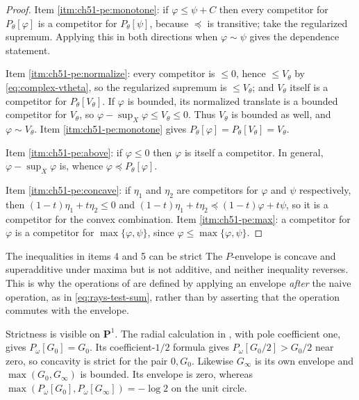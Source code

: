 \begin{proof}
Item \cref{itm:ch51-pe:monotone}: if $\varphi\leq\psi+C$ then every
competitor for $P_\theta[\varphi]$ is a competitor for
$P_\theta[\psi]$, because $\preceq$ is transitive; take the
regularized supremum.  Applying this in both directions when
$\varphi\sim\psi$ gives the dependence statement.

Item \cref{itm:ch51-pe:normalize}: every competitor is $\leq0$, hence
$\leq V_\theta$ by \eqref{eq:complex-vtheta}, so the regularized
supremum is $\leq V_\theta$; and $V_\theta$ itself is a competitor for
$P_\theta[V_\theta]$.  If $\varphi$ is bounded, its normalized
translate is a bounded competitor for $V_\theta$, so
$\varphi-\sup_X\varphi\leq V_\theta\leq0$.  Thus $V_\theta$ is bounded
as well, and $\varphi\sim V_\theta$.  Item \cref{itm:ch51-pe:monotone} gives
$P_\theta[\varphi]=P_\theta[V_\theta]=V_\theta$.

Item \cref{itm:ch51-pe:above}: if $\varphi\leq0$ then $\varphi$ is
itself a competitor.  In general, $\varphi-\sup_X\varphi$ is, whence
$\varphi\preceq P_\theta[\varphi]$.

Item \cref{itm:ch51-pe:concave}: if $\eta_1$ and $\eta_2$ are
competitors for $\varphi$ and $\psi$ respectively, then
$(1-t)\eta_1+t\eta_2\leq0$ and
$(1-t)\eta_1+t\eta_2\preceq(1-t)\varphi+t\psi$, so it is a competitor
for the convex combination.  Item \cref{itm:ch51-pe:max}: a competitor for
$\varphi$ is a competitor for $\max\{\varphi,\psi\}$, since
$\varphi\leq\max\{\varphi,\psi\}$.
\end{proof}

\begin{warning}{The inequalities in items 4 and 5 can be strict}
\label{warn:ch51-p-not-linear}
The $P$-envelope is concave and superadditive under maxima but is not
additive, and neither inequality reverses.  This is why the operations
of  are defined by applying an envelope
\emph{after} the naive operation, as in
\eqref{eq:rays-test-sum}, rather than by asserting that the operation
commutes with the envelope.

Strictness is visible on $\mathbf P^1$.  The radial calculation in
, with pole coefficient one, gives
$P_\omega[G_0]=G_0$.  Its coefficient-$1/2$ formula gives
$P_\omega[G_0/2]>G_0/2$ near zero, so concavity is strict for the pair
$0,G_0$.  Likewise $G_\infty$ is its own envelope and
$\max(G_0,G_\infty)$ is bounded.  Its envelope is zero, whereas
$\max(P_\omega[G_0],P_\omega[G_\infty])=-\log2$ on the unit circle.
\end{warning}

